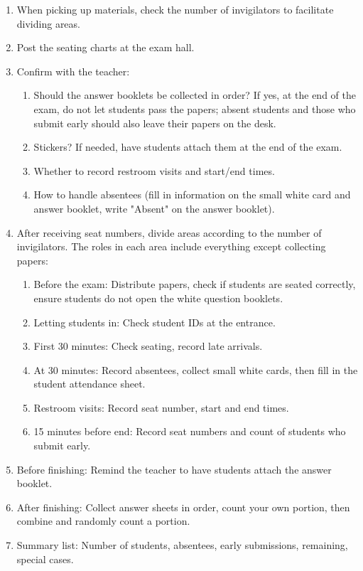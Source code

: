 \begin{enumerate}
    \item When picking up materials, check the number of invigilators to facilitate dividing areas.
    \item Post the seating charts at the exam hall.
    \item Confirm with the teacher:
    \begin{enumerate}
        \item Should the answer booklets be collected in order? If yes, at the end of the exam, do not let students pass the papers; absent students and those who submit early should also leave their papers on the desk.
        \item Stickers? If needed, have students attach them at the end of the exam.
        \item Whether to record restroom visits and start/end times.
        \item How to handle absentees (fill in information on the small white card and answer booklet, write "Absent" on the answer booklet).
    \end{enumerate}
    \item After receiving seat numbers, divide areas according to the number of invigilators. The roles in each area include everything except collecting papers:
    \begin{enumerate}
        \item Before the exam: Distribute papers, check if students are seated correctly, ensure students do not open the white question booklets.
        \item Letting students in: Check student IDs at the entrance.
        \item First 30 minutes: Check seating, record late arrivals.
        \item At 30 minutes: Record absentees, collect small white cards, then fill in the student attendance sheet.
        \item Restroom visits: Record seat number, start and end times.
        \item 15 minutes before end: Record seat numbers and count of students who submit early.
    \end{enumerate}
    \item Before finishing: Remind the teacher to have students attach the answer booklet.
    \item After finishing: Collect answer sheets in order, count your own portion, then combine and randomly count a portion.
    \item Summary list: Number of students, absentees, early submissions, remaining, special cases.
\end{enumerate}

